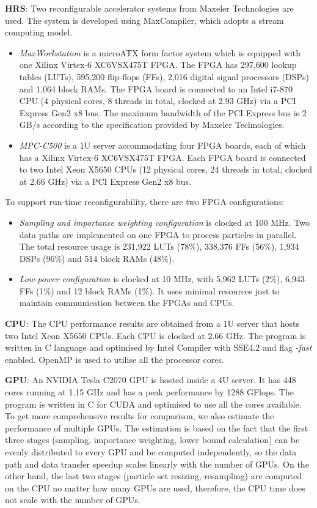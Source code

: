 \textbf{HRS}: Two reconfigurable accelerator systems from Maxeler Technologies are used.
The system is developed using MaxCompiler, which adopts a stream computing model.
\begin{itemize}
\item \textit{MaxWorkstation} is a microATX form factor system which is equipped with one Xilinx Virtex-6 XC6VSX475T FPGA.
The FPGA has 297,600 lookup tables (LUTs), 595,200 flip-flops (FFs), 2,016 digital signal processors (DSPs) and 1,064 block RAMs. 
The FPGA board is connected to an Intel i7-870 CPU (4 physical cores, 8 threads in total, clocked at 2.93 GHz) via a PCI Express Gen2 x8 bus.
The maximum bandwidth of the PCI Express bus is 2 GB/s according to the specification provided by Maxeler Technologies.
\item \textit{MPC-C500} is a 1U server accommodating four FPGA boards, each of which has a Xilinx Virtex-6 XC6VSX475T FPGA.
Each FPGA board is connected to two Intel Xeon X5650 CPUs (12 physical cores, 24 threads in total, clocked at 2.66 GHz) via a PCI Express Gen2 x8 bus.
\end{itemize}

To support run-time reconfigurability, there are two FPGA configurations:
\begin{itemize}
\item {\it Sampling and importance weighting configuration} is clocked at 100 MHz.
Two data paths are implemented on one FPGA to process particles in parallel.
The total resource usage is 231,922 LUTs (78\%), 338,376 FFs (56\%), 1,934 DSPs (96\%) and 514 block RAMs (48\%).
\item {\it Low-power configuration} is clocked at 10 MHz, with 5,962 LUTs (2\%), 6,943 FFs (1\%) and 12 block RAMs (1\%).
It uses minimal resources just to maintain communication between the FPGAs and CPUs.
\end{itemize}

\textbf{CPU}: The CPU performance results are obtained from a 1U server that hosts two Intel Xeon X5650 CPUs. 
Each CPU is clocked at 2.66 GHz.
The program is written in C language and optimised by Intel Compiler with SSE4.2 and flag {\it -fast} enabled.
OpenMP is used to utilise all the processor cores.

\textbf{GPU}: An NVIDIA Tesla C2070 GPU is hosted inside a 4U server.
It has 448 cores running at 1.15 GHz and has a peak performance by 1288 GFlops.
The program is written in C for CUDA and optimised to use all the cores available.
To get more comprehensive results for comparison, we also estimate the performance of multiple GPUs.
The estimation is based on the fact that the first three stages (sampling, importance weighting, lower bound calculation) can be evenly distributed to every GPU and be computed independently, 
so the data path and data transfer speedup scales linearly with the number of GPUs.
On the other hand, the last two stages (particle set resizing, resampling) are computed on the CPU no matter how many GPUs are used, therefore, the CPU time does not scale with the number of GPUs.

